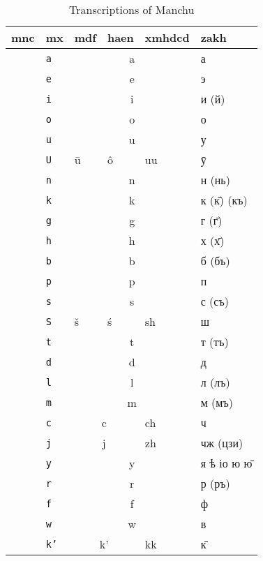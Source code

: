 \documentclass{article}
\begin{document}
\newcommand{\mncletter}[1]{\raisebox{.5em}{\rotatebox{-90}{\textmanchu{#1}}} & \texttt{#1}}
\newcommand{\textchinese}[1]{{\chinesefont #1}}
\begin{table}[htbp]
\caption{Transcriptions of Manchu}
\begin{center}
\begin{tabular}{clllll}
\toprule
mnc & mx & mdf & haen & xmhdcd & zakh\\
\midrule
\mncletter{a} & \multicolumn{3}{c}{a} & а\\
\mncletter{e} & \multicolumn{3}{c}{e} & э\\
\mncletter{i} & \multicolumn{3}{c}{i} & и (й)\\
\mncletter{o} & \multicolumn{3}{c}{o} & о\\
\mncletter{u} & \multicolumn{3}{c}{u} & у\\
\mncletter{U} & ū & ô & uu & ӯ\\
\mncletter{n} & \multicolumn{3}{c}{n} & н (нь)\\
\mncletter{k} & \multicolumn{3}{c}{k} & к (к̄) (къ)\\
\mncletter{g} & \multicolumn{3}{c}{g} & г (г̄)\\
\mncletter{h} & \multicolumn{3}{c}{h} & х (х̄)\\
\mncletter{b} & \multicolumn{3}{c}{b} & б (бъ)\\
\mncletter{p} & \multicolumn{3}{c}{p} & п\\
\mncletter{s} & \multicolumn{3}{c}{s} & с (съ)\\
\mncletter{S} & š & ś & sh & ш\\
\mncletter{t} & \multicolumn{3}{c}{t} & т (тъ)\\
\mncletter{d} & \multicolumn{3}{c}{d} & д\\
\mncletter{l} & \multicolumn{3}{c}{l} & л (лъ)\\
\mncletter{m} & \multicolumn{3}{c}{m} & м (мъ)\\
\mncletter{c} & \multicolumn{2}{c}{c} & ch & ч\\
\mncletter{j} & \multicolumn{2}{c}{j} & zh & чж (цзи)\\
\mncletter{y} & \multicolumn{3}{c}{y} & я ѣ іо ю ю̄\\
\mncletter{r} & \multicolumn{3}{c}{r} & р (ръ)\\
\mncletter{f} & \multicolumn{3}{c}{f} & ф\\
\mncletter{w} & \multicolumn{3}{c}{w} & в\\
\mncletter{k'} & \multicolumn{2}{c}{k’} & kk & к̄\\

\end{tabular}
\end{center}
\end{table}
\end{document}

